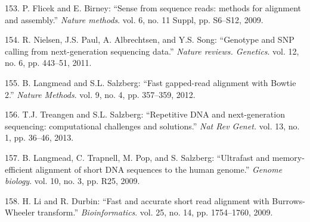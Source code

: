 \documentclass[12pt,a4paper,twoside]{ugathesis}
\theoremstyle{definition}
\theoremstyle{definition}
\theoremstyle{definition}
\theoremstyle{remark}
\begin{document}
\hypertarget{ref-Flicek2009}{}
153. P. Flicek and E. Birney: ``Sense from sequence reads: methods for
alignment and assembly.'' \emph{Nature methods}. vol. 6, no. 11 Suppl,
pp. S6--S12, 2009.

\hypertarget{ref-Nielsen2011}{}
154. R. Nielsen, J.S. Paul, A. Albrechtsen, and Y.S. Song: ``Genotype
and SNP calling from next-generation sequencing data.'' \emph{Nature
reviews. Genetics}. vol. 12, no. 6, pp. 443--51, 2011.

\hypertarget{ref-Langmead2012}{}
155. B. Langmead and S.L. Salzberg: ``Fast gapped-read alignment with
Bowtie 2.'' \emph{Nature Methods}. vol. 9, no. 4, pp. 357--359, 2012.

\hypertarget{ref-Treangen2013}{}
156. T.J. Treangen and S.L. Salzberg: ``Repetitive DNA and
next-generation sequencing: computational challenges and solutions.''
\emph{Nat Rev Genet.} vol. 13, no. 1, pp. 36--46, 2013.

\hypertarget{ref-Langmead2009}{}
157. B. Langmead, C. Trapnell, M. Pop, and S. Salzberg: ``Ultrafast and
memory-efficient alignment of short DNA sequences to the human genome.''
\emph{Genome biology}. vol. 10, no. 3, pp. R25, 2009.

\hypertarget{ref-Li2009b}{}
158. H. Li and R. Durbin: ``Fast and accurate short read alignment with
Burrows-Wheeler transform.'' \emph{Bioinformatics}. vol. 25, no. 14, pp.
1754--1760, 2009.
\end{document}
